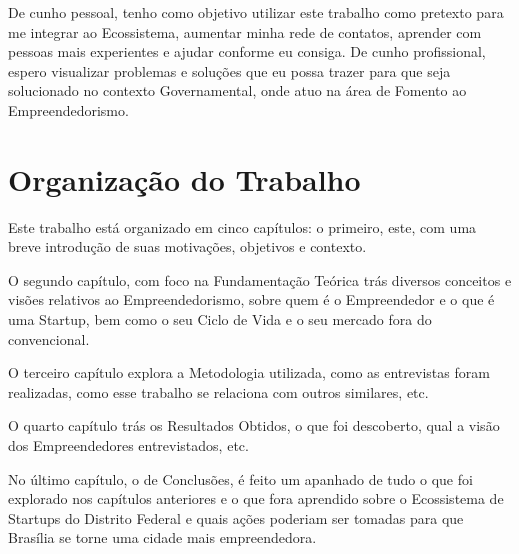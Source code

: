 De cunho pessoal, tenho como objetivo utilizar este trabalho como pretexto para me integrar ao Ecossistema, aumentar minha rede de contatos, aprender com pessoas mais experientes e ajudar conforme eu consiga. De cunho profissional, espero visualizar problemas e soluções que eu possa trazer para que seja solucionado no contexto Governamental, onde atuo na área de Fomento ao Empreendedorismo.

\section{Organização do Trabalho}
\label{section:organizacao_do_trabalho}

Este trabalho está organizado em cinco capítulos: o primeiro, este, com uma breve introdução de suas motivações, objetivos e contexto. 

O segundo capítulo, com foco na Fundamentação Teórica trás diversos conceitos e visões relativos ao Empreendedorismo, sobre quem é o Empreendedor e o que é uma Startup, bem como o seu Ciclo de Vida e o seu mercado fora do convencional. 

O terceiro capítulo explora a Metodologia utilizada, como as entrevistas foram realizadas, como esse trabalho se relaciona com outros similares, etc. 

O quarto capítulo trás os Resultados Obtidos, o que foi descoberto, qual a visão dos Empreendedores entrevistados, etc.

No último capítulo, o de Conclusões, é feito um apanhado de tudo o que foi explorado nos capítulos anteriores e o que fora aprendido sobre o Ecossistema de Startups do Distrito Federal e quais ações poderiam ser tomadas para que Brasília se torne uma cidade mais empreendedora.